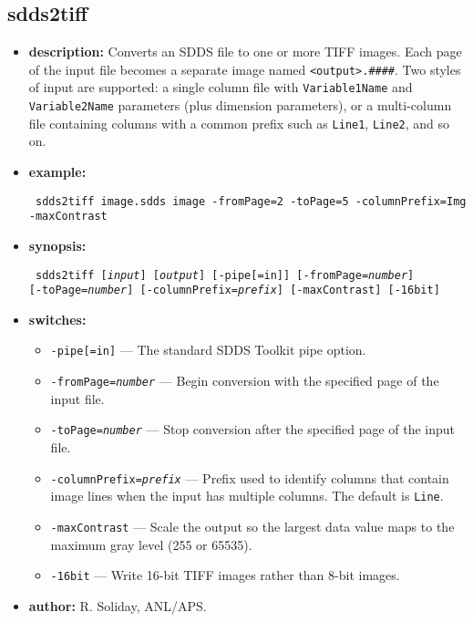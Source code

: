 \newpage
\subsection{sdds2tiff}
\label{sdds2tiff}

\begin{itemize}
\item {\bf description:} Converts an SDDS file to one or more TIFF images.  Each page of the input
file becomes a separate image named {\tt <output>.\#\#\#\#}.  Two styles of input are
supported: a single column file with {\tt Variable1Name} and {\tt Variable2Name}
parameters (plus dimension parameters), or a multi-column file containing
columns with a common prefix such as {\tt Line1}, {\tt Line2}, and so on.
\item {\bf example:}
\begin{flushleft}{\tt
sdds2tiff image.sdds image -fromPage=2 -toPage=5 -columnPrefix=Img -maxContrast
}\end{flushleft}
\item {\bf synopsis:}
\begin{flushleft}{\tt
sdds2tiff [{\em input}] [{\em output}] [-pipe[=in]] [-fromPage={\em number}]\\
  {}[-toPage={\em number}] [-columnPrefix={\em prefix}] [-maxContrast] [-16bit]
}\end{flushleft}
\item {\bf switches:}
  \begin{itemize}
  \item {\tt -pipe[=in]} --- The standard SDDS Toolkit pipe option.
  \item {\tt -fromPage={\em number}} --- Begin conversion with the specified page
    of the input file.
  \item {\tt -toPage={\em number}} --- Stop conversion after the specified page
    of the input file.
  \item {\tt -columnPrefix={\em prefix}} --- Prefix used to identify columns that
    contain image lines when the input has multiple columns.  The default is
    {\tt Line}.
  \item {\tt -maxContrast} --- Scale the output so the largest data value maps to
    the maximum gray level (255 or 65535).
  \item {\tt -16bit} --- Write 16-bit TIFF images rather than 8-bit images.
  \end{itemize}
\item {\bf author:} R. Soliday, ANL/APS.
\end{itemize}
